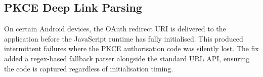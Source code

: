 \subsection{PKCE Deep Link Parsing}

On certain Android devices, the OAuth redirect URI is delivered to the application before the JavaScript runtime has fully initialised. This produced intermittent failures where the PKCE authorisation code was silently lost. The fix added a regex-based fallback parser alongside the standard URL API, ensuring the code is captured regardless of initialisation timing.
